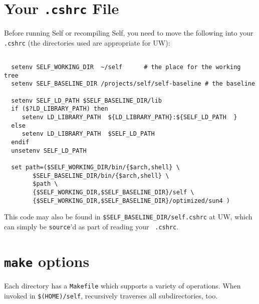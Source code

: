 \section{Your {\tt .cshrc} File}

Before running Self or recompiling Self, you need to move the
following into your {\tt .cshrc} (the directories used are appropriate for
UW):

\begin{tt}
\begin{small}
\begin{verbatim}

  setenv SELF_WORKING_DIR  ~/self	   # the place for the working tree
  setenv SELF_BASELINE_DIR /projects/self/self-baseline # the baseline

  setenv SELF_LD_PATH $SELF_BASELINE_DIR/lib
  if ($?LD_LIBRARY_PATH) then
     setenv LD_LIBRARY_PATH	 ${LD_LIBRARY_PATH}:${SELF_LD_PATH  }
  else
     setenv LD_LIBRARY_PATH	 $SELF_LD_PATH
  endif
  unsetenv SELF_LD_PATH

  set path=($SELF_WORKING_DIR/bin/{$arch,shell} \
	    $SELF_BASELINE_DIR/bin/{$arch,shell} \
	    $path \
	    {$SELF_WORKING_DIR,$SELF_BASELINE_DIR}/self \
	    {$SELF_WORKING_DIR,$SELF_BASELINE_DIR}/optimized/sun4 )

\end{verbatim}
\end{small}
\end{tt}

This code may also be found in {\tt \${SELF\_BASELINE\_DIR}/self.cshrc}
at UW, which can simply be {\tt source}'d as part of reading your {\tt
.cshrc}.

\section{{\tt make} options}

Each directory has a {\tt Makefile} which supports a variety of
operations.  When invoked in {\tt \$(HOME)/self}, recursively traverses all
subdirectories, too.

